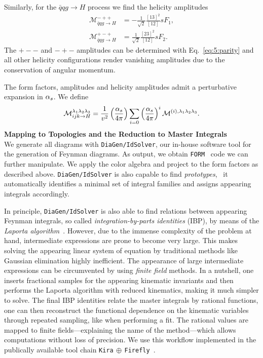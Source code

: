 Similarly, for the $\bar{q}q g \rightarrow H$ process we find the helicity amplitudes
\begin{equation}
\begin{split}
\mathcal{M}^{-++}_{\bar{q}q g \rightarrow H} &= - \frac{1}{\sqrt{2}} \frac{[13]^2}{[12]} s F_1, \\
\mathcal{M}^{+-+}_{\bar{q}q g \rightarrow H} &= \frac{1}{\sqrt{2}} \frac{[23]^2}{[12]} s F_2.
\end{split}
\end{equation}
The $+--$ and $-+-$ amplitudes can be determined with Eq.~\eqref{eq:5:parity} and all other helicity configurations render vanishing amplitudes due to the conservation of angular momentum.

The form factors, amplitudes and helicity amplitudes admit a perturbative expansion in $\alpha_s$. We define
\begin{equation}
\mathcal{M}^{\lambda_1\lambda_2 \lambda_3}_{ijk \rightarrow H} = \frac{1}{v^2} \left(\frac{\alpha_s}{4 \pi} \right) \sum_{i = 0} \left(\frac{\alpha_s}{4 \pi} \right)^i \mathcal{M}^{(i),\lambda_1 \lambda_2 \lambda_3}.
\end{equation}
\textbf{Mapping to Topologies and the Reduction to Master Integrals} \\
We generate all diagrams with \texttt{DiaGen/IdSolver}, our in-house software tool for the generation of Feynman diagrams. As output, we obtain \texttt{FORM}~\cite{Vermaseren:2000nd, Ruijl:2017dtg} code we can further manipulate. We apply the color algebra and project to the form factors as described above. \texttt{DiaGen/IdSolver} is also capable to find \textit{prototypes}, \ie\ it automatically identifies a minimal set of integral families and assigns appearing integrals accordingly.

In principle, \texttt{DiaGen/IdSolver} is also able to find relations between appearing Feynman integrals, so called \textit{integration-by-parts identities} (\acs{IBP}), by means of the \textit{Laporta algorithm}~\cite{Laporta:2000dsw}. However, due to the immense complexity of the problem at hand, intermediate expressions are prone to become very large. This makes solving the appearing linear system of equation by traditional methods like Gaussian elimination highly inefficient. The appearance of large intermediate expressions can be circumvented by using \textit{finite field} methods. In a nutshell, one inserts fractional samples for the appearing kinematic invariants and then performs the Laporta algorithm with reduced kinematics, making it much simpler to solve. The final \acs{IBP} identities relate the master integrals by rational functions, one can then reconstruct the functional dependence on the kinematic variables through repeated sampling, like when performing a fit. The rational values are mapped to finite fields---explaining the name of the method---which allows computations without loss of precision. We use this workflow implemented in the publically available tool chain \texttt{Kira$\,\oplus\,$Firefly}~\cite{Maierhofer:2017gsa, Maierhofer:2018gpa, Klappert:2020nbg}.

